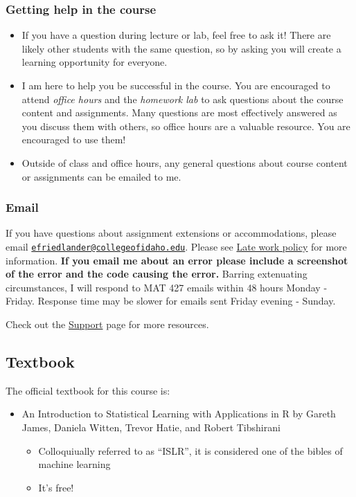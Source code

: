 \documentclass[
  letterpaper,
  DIV=11,
  numbers=noendperiod]{scrartcl}
\providecommand{\tightlist}{%
  \setlength{\itemsep}{0pt}\setlength{\parskip}{0pt}}\usepackage{longtable,booktabs,array}
\begin{document}
\subsubsection{Getting help in the
course}\label{getting-help-in-the-course}

\begin{itemize}
\tightlist
\item
  If you have a question during lecture or lab, feel free to ask it!
  There are likely other students with the same question, so by asking
  you will create a learning opportunity for everyone.
\item
  I am here to help you be successful in the course. You are encouraged
  to attend \emph{office hours} and the \emph{homework lab} to ask
  questions about the course content and assignments. Many questions are
  most effectively answered as you discuss them with others, so office
  hours are a valuable resource. You are encouraged to use them!
\item
  Outside of class and office hours, any general questions about course
  content or assignments can be emailed to me.
\end{itemize}

\subsubsection{Email}\label{email}

If you have questions about assignment extensions or accommodations,
please email
\href{mailto:efriedlander@collegeofidaho.edu}{\nolinkurl{efriedlander@collegeofidaho.edu}}.
Please see \hyperref[late-work-policy]{Late work policy} for more
information. \textbf{If you email me about an error please include a
screenshot of the error and the code causing the error.} Barring
extenuating circumstances, I will respond to MAT 427 emails within 48
hours Monday - Friday. Response time may be slower for emails sent
Friday evening - Sunday.

Check out the \href{support.qmd}{Support} page for more resources.

\subsection{Textbook}\label{textbook}

The official textbook for this course is:

\begin{itemize}
\item
  An Introduction to Statistical Learning with Applications in R by
  Gareth James, Daniela Witten, Trevor Hatie, and Robert Tibshirani

  \begin{itemize}
  \item
    Colloquiually referred to as ``ISLR'', it is considered one of the
    bibles of machine learning
  \item
    It's free!
  \end{itemize}
\end{itemize}
\end{document}
